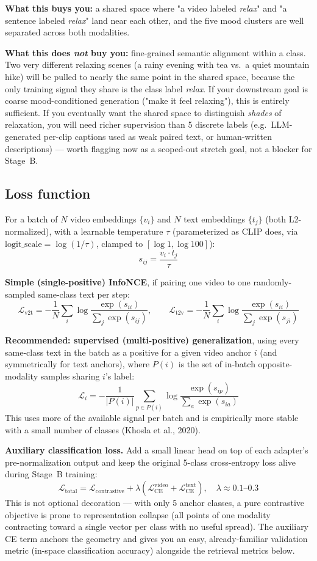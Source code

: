 \documentclass[11pt]{article}
\begin{document}
\textbf{What this buys you:} a shared space where "a video labeled \emph{relax}" and "a sentence
labeled \emph{relax}" land near each other, and the five mood clusters are well separated across
both modalities.

\textbf{What this does \emph{not} buy you:} fine-grained semantic alignment within a class. Two
very different relaxing scenes (a rainy evening with tea vs.\ a quiet mountain hike) will be
pulled to nearly the same point in the shared space, because the only training signal they share
is the class label \emph{relax}. If your downstream goal is coarse mood-conditioned generation
("make it feel relaxing"), this is entirely sufficient. If you eventually want the shared space to
distinguish \emph{shades} of relaxation, you will need richer supervision than 5 discrete labels
(e.g.\ LLM-generated per-clip captions used as weak paired text, or human-written descriptions) —
worth flagging now as a scoped-out stretch goal, not a blocker for Stage~B.

\subsection{Loss function}
For a batch of $N$ video embeddings $\{v_i\}$ and $N$ text embeddings $\{t_j\}$ (both
L2-normalized), with a learnable temperature $\tau$ (parameterized as CLIP does, via
$\text{logit\_scale} = \log(1/\tau)$, clamped to $[\log 1, \log 100]$):
\[
s_{ij} = \frac{v_i \cdot t_j}{\tau}
\]

\textbf{Simple (single-positive) InfoNCE}, if pairing one video to one randomly-sampled
same-class text per step:
\[
\mathcal{L}_{\text{v2t}} = -\frac{1}{N}\sum_i \log \frac{\exp(s_{ii})}{\sum_j \exp(s_{ij})}, \qquad
\mathcal{L}_{\text{t2v}} = -\frac{1}{N}\sum_i \log \frac{\exp(s_{ii})}{\sum_j \exp(s_{ji})}
\]

\textbf{Recommended: supervised (multi-positive) generalization}, using every same-class text in
the batch as a positive for a given video anchor $i$ (and symmetrically for text anchors), where
$P(i)$ is the set of in-batch opposite-modality samples sharing $i$'s label:
\[
\mathcal{L}_i = -\frac{1}{|P(i)|}\sum_{p \in P(i)} \log \frac{\exp(s_{ip})}{\sum_{a} \exp(s_{ia})}
\]
This uses more of the available signal per batch and is empirically more stable with a small
number of classes (Khosla et al., 2020).

\textbf{Auxiliary classification loss.} Add a small linear head on top of each adapter's
pre-normalization output and keep the original 5-class cross-entropy loss alive during Stage~B
training:
\[
\mathcal{L}_{\text{total}} = \mathcal{L}_{\text{contrastive}} + \lambda \left( \mathcal{L}_{\text{CE}}^{\text{video}} + \mathcal{L}_{\text{CE}}^{\text{text}} \right), \quad \lambda \approx 0.1\text{--}0.3
\]
This is not optional decoration — with only 5 anchor classes, a pure contrastive objective is
prone to representation collapse (all points of one modality contracting toward a single vector
per class with no useful spread). The auxiliary CE term anchors the geometry and gives you an
easy, already-familiar validation metric (in-space classification accuracy) alongside the
retrieval metrics below.
\end{document}
